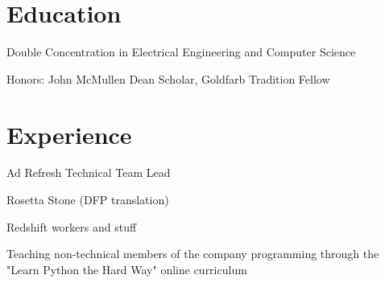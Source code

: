 \documentclass[]{resume-openfont}
\begin{document}
\lastupdated
{}

\section{Education}
        \begin{tightemize}
        \item
            Double Concentration in Electrical Engineering and Computer Science
        \item
            Honors: John McMullen Dean Scholar, Goldfarb Tradition Fellow
        \end{tightemize}
\sectionsep

\section{Experience}

    \begin{tightemize}
        \item
            Ad Refresh Technical Team Lead
        \item
            Rosetta Stone (DFP translation)
        \item
            Redshift workers and stuff
        \item
            Teaching non-technical members of the company programming through
            the "Learn Python the Hard Way" online curriculum
    \end{tightemize}
\sectionsep
\end{document}
